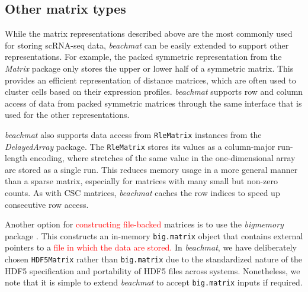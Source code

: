 \documentclass{article}
\newcommand{\beachmat}{\textit{beachmat}}
\newcommand{\code}[1]{\texttt{#1}}
\newcommand{\revised}[1]{\textcolor{red}{#1}}
\begin{document}
\subsection{Other matrix types}
While the matrix representations described above are the most commonly used for storing scRNA-seq data, \beachmat{} can be easily extended to support other representations.
For example, the packed symmetric representation from the \textit{Matrix} package only stores the upper or lower half of a symmetric matrix.
This provides an efficient representation of distance matrices, which are often used to cluster cells based on their expression profiles.
\beachmat{} supports row and column access of data from packed symmetric matrices through the same interface that is used for the other representations.

\beachmat{} also supports data access from \code{RleMatrix} instances from the \textit{DelayedArray} package.
The \code{RleMatrix} stores its values as a column-major run-length encoding, where stretches of the same value in the one-dimensional array are stored as a single run.
This reduces memory usage in a more general manner than a sparse matrix, especially for matrices with many small but non-zero counts.
As with CSC matrices, \beachmat{} caches the row indices to speed up consecutive row access.

Another option for \revised{constructing file-backed} matrices is to use the \textit{bigmemory} package \cite{kane2013scalable}.
This constructs an in-memory \code{big.matrix} object that contains external pointers to a \revised{file in which the data are stored.}
In \beachmat{}, we have deliberately chosen \code{HDF5Matrix} rather than \code{big.matrix} due to the standardized nature of the HDF5 specification and portability of HDF5 files across systems.
Nonetheless, we note that it is simple to extend \beachmat{} to accept \code{big.matrix} inputs if required.
\end{document}
